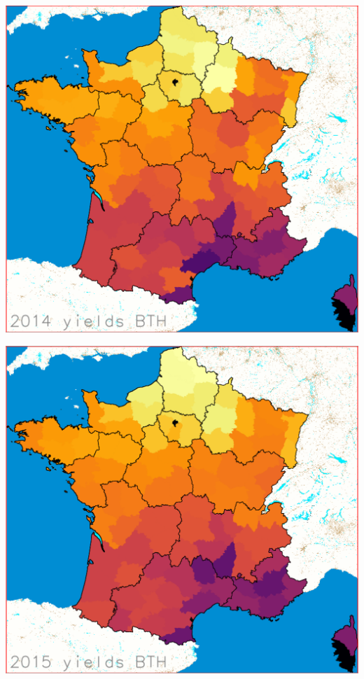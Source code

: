 \documentclass[landscape]{slides}
\begin{document}
\begin{slide} 
\includegraphics[width=\textwidth]{y2014}
\end{slide}
\begin{slide} 
\includegraphics[width=\textwidth]{y2015}
\end{slide}
\end{document}
